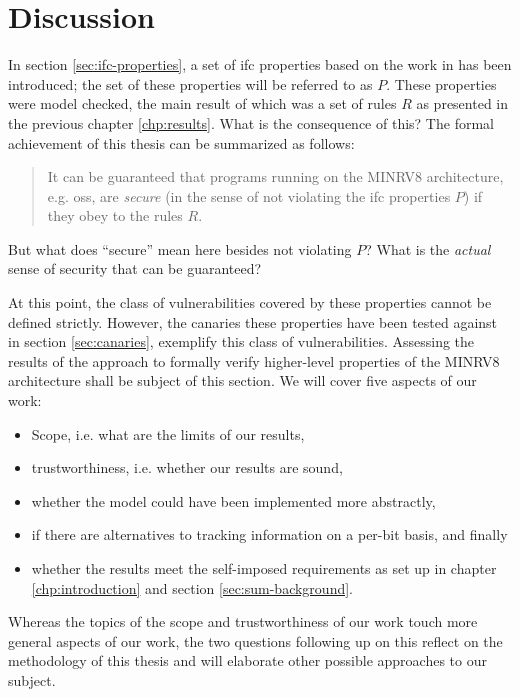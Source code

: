 
\chapter{Discussion}
\label{chp:discussion}

In section \ref{sec:ifc-properties}, a set of \gls{ifc} properties based on the work in \cite{Ferraiuolo17} has been introduced; the set of these properties will be referred to as $ P $.
These properties were model checked, the main result of which was a set of rules $ R $ as presented in the previous chapter \ref{chp:results}.
What is the consequence of this?
The formal achievement of this thesis can be summarized as follows:
\begin{quote}
    It can be guaranteed that programs running on the MINRV8 architecture, e.g. \glspl{os}, are \textit{secure} (in the sense of not violating the \gls{ifc} properties $ P $) if they obey to the rules $ R $.
\end{quote}
But what does \enquote{secure} mean here besides not violating $ P $?
What is the \textit{actual} sense of security that can be guaranteed?

At this point, the class of vulnerabilities covered by these properties cannot be defined strictly.
However, the canaries these properties have been tested against in section \ref{sec:canaries}, exemplify this class of vulnerabilities.
Assessing the results of the approach to formally verify higher-level properties of the MINRV8 architecture shall be subject of this section.
We will cover five aspects of our work:
\begin{itemize}
    \item Scope, i.e. what are the limits of our results,
    \item trustworthiness, i.e. whether our results are sound,
    \item whether the model could have been implemented more abstractly,
    \item if there are alternatives to tracking information on a per-bit basis, and finally
    \item whether the results meet the self-imposed requirements as set up in chapter \ref{chp:introduction} and section \ref{sec:sum-background}.
\end{itemize}

Whereas the topics of the scope and trustworthiness of our work touch more general aspects of our work, the two questions following up on this reflect on the methodology of this thesis and will elaborate other possible approaches to our subject.

